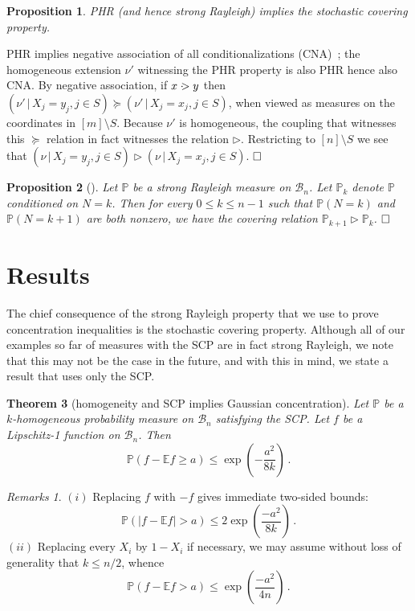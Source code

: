 \documentclass[10pt]{article}
\theoremstyle{plain}
\newtheorem{thm}{Theorem}[section]
\newtheorem{pr}[thm]{Proposition}
\theoremstyle{remark}
\newtheorem*{unremarks}{Remarks}
\def\Cox{\qed}
\def\E{{\mathbb E}}
\def\P{{\mathbb P}}
\def\Cox{\hfill \Box}
\def\|{{\, | \, }}
\def\B{{\mathcal B}}
\def\covers{\; \cdot \kern-5pt >}
\def\mcovers{\triangleright}
\def\msr{\nu}
\begin{document}
\begin{pr} \label{pr:SR -> SCP}
PHR (and hence strong Rayleigh) implies the stochastic covering property.
\end{pr}

 PHR implies negative association of all
conditionalizations (CNA)~\cite[Theorem~4.10]{borcea-branden-liggett};
the homogeneous extension $\msr'$ witnessing the PHR property is
also PHR hence also CNA.  By negative association,
if $x \covers y$ then $(\msr' \| X_j = y_j , j \in S) \succeq
(\msr' \| X_j = x_j , j \in S)$, when viewed as measures on the
coordinates in $[m] \setminus S$.  Because $\msr'$ is homogeneous,
the coupling that witnesses this $\succeq$ relation in fact witnesses
the relation $\mcovers$.  Restricting to $[n] \setminus S$ we see
that $(\msr \| X_j = y_j , j \in S) \mcovers (\msr \| X_j = x_j , j \in S)$.
$\Cox$

\begin{pr}[]
\label{pr:k cover}
Let $\P$ be a strong Rayleigh measure on $\B_n$.
Let $\P_k$ denote $\P$ conditioned on $N = k$.  Then for every
$0 \leq k \leq n-1$ such that $\P (N=k)$ and $\P(N=k+1)$ are
both nonzero, we have the covering relation $\P_{k+1} \mcovers \P_k$.
$\Cox$
\end{pr}

\section{Results} \label{sec:results}

The chief consequence of the strong Rayleigh property that
we use to prove concentration inequalities is the
stochastic covering property.
Although all of our examples so far of measures with the SCP are
in fact strong Rayleigh, we note that this may not be the case in
the future, and with this in mind, we state a result that uses
only the SCP.
%
\begin{thm}[homogeneity and SCP implies Gaussian concentration]
\label{th:main}
Let $\P$ be a $k$-homogeneous probability measure on $\B_n$
satisfying the SCP.  Let $f$ be a Lipschitz-1 function on $\B_n$.
Then
$$ \P (f - \E f \geq a) \leq \exp \left ( - \frac{a^2}{8k} \right
   ) \, .  $$
\end{thm}
%
\begin{unremarks}
$(i)$ Replacing $f$ with $-f$ gives immediate two-sided bounds:
\begin{equation} \label{eq:two sided}
\P (|f - \E f| > a) \leq 2 \exp \left ( \frac{-a^2}{8 k} \right )  \, .
\end{equation}
$(ii)$ Replacing every $X_i$ by $1 - X_i$ if necessary, we may
assume without loss of generality that $k \leq n/2$, whence
\begin{equation} \label{eq:k to n}
\P (f - \E f > a) \leq \exp \left ( \frac{-a^2}{4 n} \right ) \, .
\end{equation}
\end{unremarks}
\end{document}
